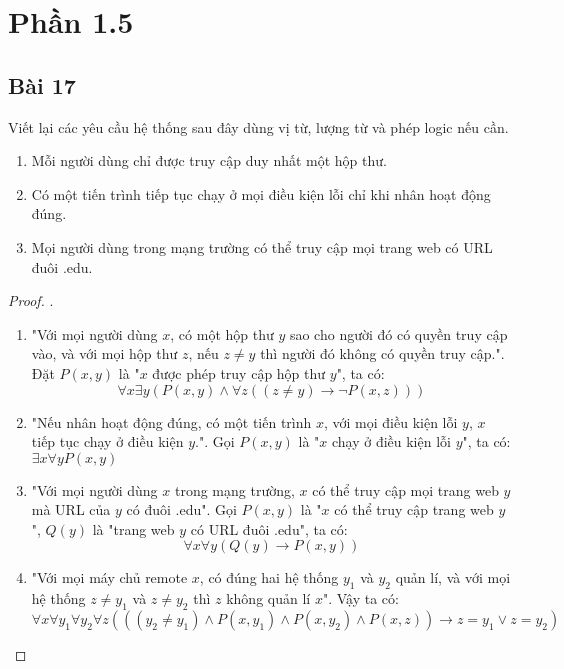 \section*{Phần 1.5}
\subsection*{Bài 17}
Viết lại các yêu cầu hệ thống sau đây dùng vị từ, lượng từ và phép logic nếu cần.
\begin{enumerate}[label=\alph*)]
    \item Mỗi người dùng chỉ được truy cập duy nhất một hộp thư.
    \item Có một tiến trình tiếp tục chạy ở mọi điều kiện lỗi chỉ khi nhân hoạt động đúng.
    \item Mọi người dùng trong mạng trường có thể truy cập mọi trang web có URL đuôi .edu.
\end{enumerate}
\begin{proof}.
    \begin{enumerate}[label=\alph*)]
        \item "Với mọi người dùng $x$, có một hộp thư $y$ sao cho người đó có quyền truy cập vào, và với mọi hộp thư $z$, nếu $z\neq y$ thì người đó không có quyền truy cập.". Đặt $P(x,y)$ là "$x$ được phép truy cập hộp thư $y$", ta có: $$\forall x\exists y(P(x,y)\land \forall z((z\neq y)\rightarrow \neg P(x,z)))$$
        \item "Nếu nhân hoạt động đúng, có một tiến trình $x$, với mọi điều kiện lỗi $y$, $x$ tiếp tục chạy ở điều kiện $y$.". Gọi $P(x,y)$ là "$x$ chạy ở điều kiện lỗi $y$", ta có: $\exists x\forall y P(x,y)$
        \item "Với mọi người dùng $x$ trong mạng trường, $x$ có thể truy cập mọi trang web $y$ mà URL của $y$ có đuôi .edu". Gọi $P(x,y)$ là "$x$ có thể truy cập trang web $y$", $Q(y)$ là "trang web $y$ có URL đuôi .edu", ta có: $$\forall x\forall y(Q(y)\rightarrow P(x,y))$$
        \item "Với mọi máy chủ remote $x$, có đúng hai hệ thống $y_1$ và $y_2$ quản lí, và với mọi hệ thống $z\neq y_1$ và $z\neq y_2$ thì $z$ không quản lí $x$". Vậy ta có: $$\forall x\forall y_1\forall y_2\forall z(((y_2\neq y_1)\land P(x,y_1)\land P(x,y_2)\land P(x,z))\rightarrow z=y_1\lor z=y_2)$$
    \end{enumerate}
\end{proof}
